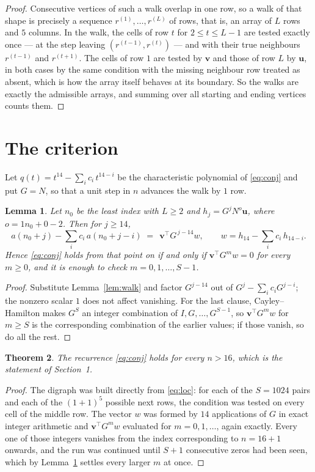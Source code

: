 \documentclass[11pt,a4paper]{article}
\theoremstyle{plain}
\newtheorem{theorem}{Theorem}
\newtheorem{lemma}[theorem]{Lemma}
\theoremstyle{definition}
\begin{document}
\begin{proof}
Consecutive vertices of such a walk overlap in one row, so a walk of that shape is
precisely a sequence $r^{(1)},\dots,r^{(L)}$ of rows, that is, an array of $L$ rows
and $5$ columns. In the walk, the cells of row $t$ for $2\le t\le L-1$ are tested
exactly once --- at the step leaving $(r^{(t-1)},r^{(t)})$ --- and with their true
neighbours $r^{(t-1)}$ and $r^{(t+1)}$. The cells of row $1$ are tested by
$\mathbf{v}$ and those of row $L$ by $\mathbf{u}$, in both cases by the same condition
with the missing neighbour row treated as absent, which is how the array itself behaves at
its boundary. So the walks are exactly the admissible arrays, and summing over all starting
and ending vertices counts them.
\end{proof}

\section{The criterion}

Let $q(t)=t^{14}-\sum_i c_i\,t^{14-i}$ be the characteristic polynomial of
\eqref{eq:conj} and put $G=N$, so that a unit step in $n$ advances the walk by
$1$ row.

\begin{lemma}\label{lem:crit}
Let $n_0$ be the least index with $L\ge2$ and $h_j=G^{j}N^{o}\mathbf{u}$, where
$o=1n_0+0-2$. Then for $j\ge14$,
\[
a(n_0+j)-\sum_i c_i\,a(n_0+j-i)\;=\;\,\mathbf{v}^{\!\top}G^{\,j-14}w,
\qquad w=h_{14}-\sum_i c_i\,h_{14-i} .
\]
Hence \eqref{eq:conj} holds from that point on if and only if
$\mathbf{v}^{\!\top}G^{m}w=0$ for every $m\ge0$, and it is enough to check
$m=0,1,\dots,S-1$.
\end{lemma}

\begin{proof}
Substitute Lemma~\ref{lem:walk} and factor $G^{j-14}$ out of
$G^{j}-\sum_ic_iG^{j-i}$; the nonzero scalar $1$ does not affect
vanishing. For the last clause, Cayley--Hamilton makes $G^{S}$ an integer combination of
$I,G,\dots,G^{S-1}$, so $\mathbf{v}^{\!\top}G^{m}w$ for $m\ge S$ is the corresponding
combination of the earlier values; if those vanish, so do all the rest.
\end{proof}

\begin{theorem}
The recurrence \eqref{eq:conj} holds for every $n>16$, which is the statement of
Section~1.
\end{theorem}

\begin{proof}
The digraph was built directly from \eqref{eq:loc}: for each of the $S=1024$ pairs and each
of the $(1+1)^{5}$ possible next rows, the condition was tested on every cell of
the middle row. The vector $w$ was formed by $14$ applications of $G$ in exact integer
arithmetic and $\mathbf{v}^{\!\top}G^{m}w$ evaluated for $m=0,1,\dots$, again exactly.
Every one of those integers vanishes from the index corresponding to $n=16+1$ onwards,
and the run was continued until $S+1$ consecutive zeros had been seen, which by
Lemma~\ref{lem:crit} settles every larger $m$ at once.
\end{proof}
\end{document}
